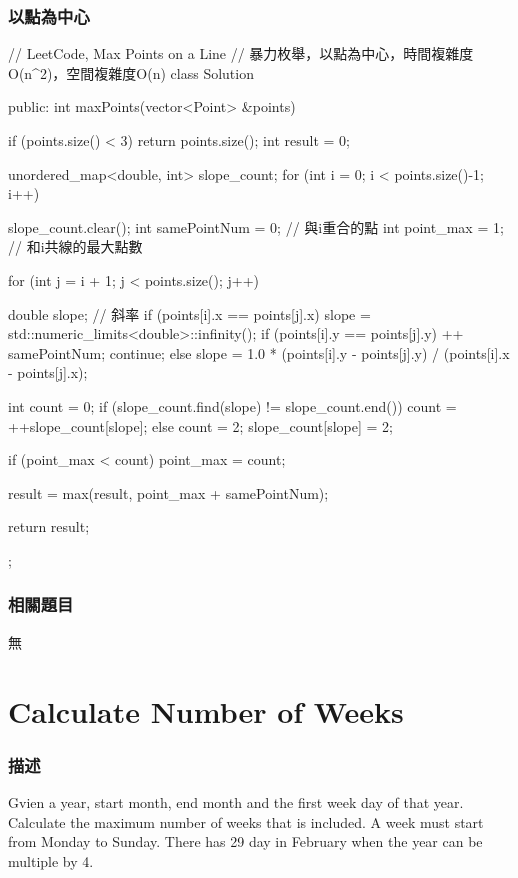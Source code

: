 \subsubsection{以點為中心}
\begin{Code}
// LeetCode, Max Points on a Line
// 暴力枚舉，以點為中心，時間複雜度O(n^2)，空間複雜度O(n)
class Solution {
public:
    int maxPoints(vector<Point> &points) {
        if (points.size() < 3) return points.size();
        int result = 0;

        unordered_map<double, int> slope_count;
        for (int i = 0; i < points.size()-1; i++) {
            slope_count.clear();
            int samePointNum = 0; // 與i重合的點
            int point_max = 1;    // 和i共線的最大點數

            for (int j = i + 1; j < points.size(); j++) {
                double slope; // 斜率
                if (points[i].x == points[j].x) {
                    slope = std::numeric_limits<double>::infinity();
                    if (points[i].y == points[j].y) {
                        ++ samePointNum;
                        continue;
                    }
                } else {
                    slope = 1.0 * (points[i].y - points[j].y) / 
                        (points[i].x - points[j].x);
                }

                int count = 0;
                if (slope_count.find(slope) != slope_count.end())
                    count = ++slope_count[slope];
                else {
                    count = 2;
                    slope_count[slope] = 2;
                }

                if (point_max < count) point_max = count;
            }
            result = max(result, point_max + samePointNum);
        }
        return result;
    }
};
\end{Code}


\subsubsection{相關題目}
\begindot
\item 無
\myenddot

\section{Calculate Number of Weeks} %
\label{sec:calculate-number-of-weeks}

\subsubsection{描述}
Gvien a year, start month, end month and the first week day of that year. Calculate the maximum number of weeks that is included.
A week must start from Monday to Sunday. There has 29 day in February when the year can be multiple by 4.

